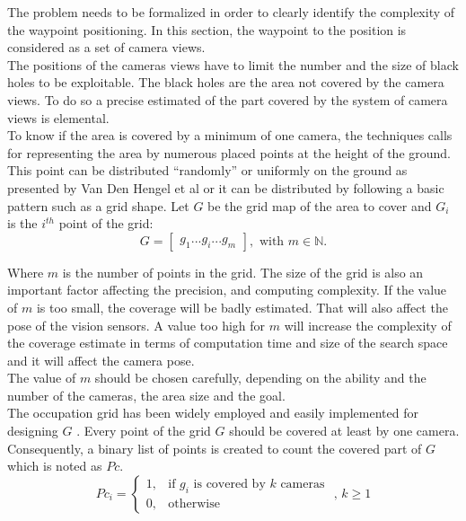 The problem needs to be formalized in order to clearly identify the complexity of the waypoint positioning.
In this section, the waypoint to the position is considered as a set of camera views. \\
The positions of the cameras views have to limit the number and the size of black holes to be exploitable. The black holes are the area not covered by the camera views. 
To do so a precise estimated of the part covered by the system of camera views is elemental.
\\To know if the area is covered by a minimum of one camera, the techniques calls for representing the area by numerous placed points at the height of the ground. This point can be distributed “randomly” or uniformly on the ground as presented by Van Den Hengel et al \cite{83*} or it can be distributed by following a basic pattern  such as a grid shape.  Let $G$ be the grid map of the area to cover and $G_i$ is the $i^{th}$  point of the grid: %
\begin{equation}
G=\begin{bmatrix}
 g_1 ...g_i ... g_m
\end{bmatrix}  ,\mbox{ with }  m\in \mathbb{N}.
\end{equation}

\noindent Where $m$ is the number of points in the grid. The size of the grid is also an important factor affecting the precision, and computing complexity. If the value  of $m$ is too small, the coverage will be badly estimated. That will also affect the pose of the vision sensors. A value too high for $m$ will increase the complexity of the coverage estimate in terms of computation time and size of the search space and it will affect the camera pose. \\
The value of $m$ should be chosen carefully, depending on the ability and the number of the cameras, the area size and the goal. \\
The occupation grid has been widely employed and easily implemented for designing $G$  \cite{8*,137*,164*,141*,151*}.
Every point of the grid $G$ should be covered at least by one camera. Consequently, a binary list of points is created to count the covered part of $G$ which is noted as $Pc$.
\begin{equation}\label{eq:Pci}
Pc_i= \begin{cases} 1, & \mbox{if } g_i\mbox{ is covered by $k$ cameras} \\ 0, & \mbox{otherwise}  \end{cases}
 \mbox{ , }k\geq 1
\end{equation}
  


